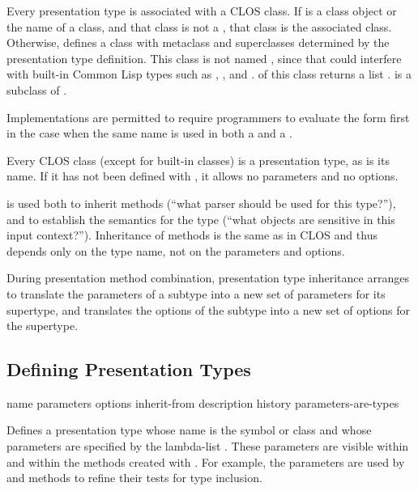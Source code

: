 Every presentation type is associated with a CLOS class.  If  is a
class object or the name of a class, and that class is not a
, that class is the associated class.  Otherwise,
 defines a class with metaclass
 and superclasses determined by the presentation
type definition.  This class is not named , since that could interfere
with built-in Common Lisp types such as , , and .
 of this class returns a list .
 is a subclass of .

Implementations are permitted to require programmers to evaluate the
 form first in the case when the same name is used in both a
 and a .

Every CLOS class (except for built-in classes) is a presentation type, as is its
name.  If it has not been defined with , it allows
no parameters and no options.

 is used both to inherit methods (``what
parser should be used for this type?''), and to establish the semantics for the
type (``what objects are sensitive in this input context?'').  Inheritance of
methods is the same as in CLOS and thus depends only on the type name, not on
the parameters and options.

During presentation method combination, presentation type inheritance arranges
to translate the parameters of a subtype into a new set of parameters for its
supertype, and translates the options of the subtype into a new set of options
for the supertype.


\subsection {Defining Presentation Types}

 {name parameters
                                      \key options inherit-from description history
                                           parameters-are-types} 

Defines a presentation type whose name is the symbol or class  and
whose parameters are specified by the lambda-list .  These
parameters are visible within  and within the methods created
with .  For example, the parameters are used by
 and  methods to refine their
tests for type inclusion.

